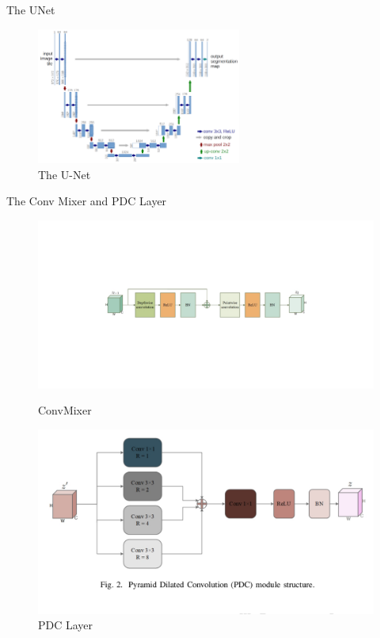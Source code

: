 \documentclass{beamer}
\begin{document}
\begin{frame}{The UNet }
\begin{figure}[H]
        \centering
        \includegraphics[width=0.6\textwidth]{u-net-architecture.png}
        \caption{The U-Net}
        \label{fig:a}
\end{figure}

\end{frame}
\begin{frame}{The Conv Mixer and PDC Layer}
    \begin{figure}[H]
    \begin{minipage}[b]{0.5\linewidth}
        \centering
        \includegraphics[width=\textwidth]{ConvMixer.png}
        \caption{ConvMixer}
        \label{fig:convmixer}
    \end{minipage}
    \hspace{0.5cm}
    \begin{minipage}[b]{0.5\linewidth}
        \centering
        \includegraphics[width=\textwidth]{PDC.png}
        \caption{PDC Layer}
        \label{fig:pdc}
    \end{minipage}
    \end{figure}
\end{frame}
\end{document}
